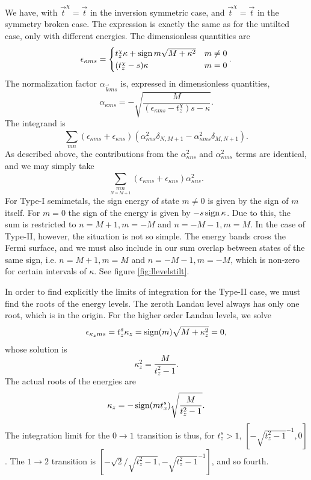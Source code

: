 We have, with \( \vec{t}^{\chi } = \vec{t} \) in the inversion symmetric case, and \( \vec{t}^{\chi } = \vec{t} \) in the symmetry broken case.
The expression is exactly the same as for the untilted case, only with different energies.
The dimensionless quantities are
\begin{equation}
  \label{eq:104}
  \epsilon_{\kappa m s} =
  \begin{cases}
    t_z^{\chi } \kappa + \operatorname{sign}{m} \sqrt{M + \kappa ^2} & m \neq 0\\
    (t_z^{\chi } - s) \kappa & m = 0
  \end{cases}.
\end{equation}
The normalization factor \( \alpha _{\vec{k} m s} \) is, expressed in dimensionless quantities,
\begin{equation}
  \label{eq:105}
  \alpha _{\kappa m s} =
  -\sqrt{\frac{M}{(\epsilon_{\kappa  m s} - t_{z}^{\chi })s - \kappa }}.
\end{equation}
The integrand is
\begin{equation}
  \label{eq:106}
  \sum\limits_{mn}^{}
  (\epsilon_{\kappa m s} + \epsilon_{\kappa n s}) (\alpha_{\kappa n s}^2 \delta _{N, M+1}- \alpha_{\kappa m s}^2 \delta_{M, N+1}).
\end{equation}
As described above, the contributions from the \( \alpha _{\kappa n s}^2  \) and \( \alpha _{\kappa m s}^2 \) terms are identical, and we may simply take
\begin{equation}
  \label{eq:107}
  \sum\limits_{\underset{N=M+1}{mn}}^{}
  (\epsilon_{\kappa m s} + \epsilon_{\kappa n s}) \alpha_{\kappa n s}^2.
\end{equation}
For Type-I semimetals, the sign energy of state \( m \neq 0 \) is given by the sign of \( m \) itself.
For \( m = 0 \) the sign of the energy is given by \( -s \operatorname{sign}{\kappa } \).
Due to this, the sum is restricted to \( n=M+1, m=-M \) and \( n=-M-1, m=M \).
In the case of Type-II, however, the situation is not so simple.
The energy bands cross the Fermi surface, and we must also include in our sum overlap between states of the same sign, i.e. \( n=M+1, m=M \) and \( n=-M-1, m=-M \), which is non-zero for certain intervals of \( \kappa  \).
See figure \ref{fig:llevelstilt}.

In order to find explicitly the limits of integration for the Type-II case, we must find the roots of the energy levels.
The zeroth Landau level always has only one root, which is in the origin.
For the higher order Landau levels, we solve
\begin{equation}
  \label{eq:93}
  \epsilon_{\kappa_z m s } = t_z^s \kappa_z = \operatorname{sign}(m) \sqrt{M + \kappa_{z} ^2} = 0,
\end{equation}
whose solution is
\[
\kappa_z^2 = \frac{M}{t_{z}^2 - 1}.
\]
The actual roots of the energies are
\begin{equation}
  \label{eq:94}
  \kappa_z = -\operatorname{sign}(m t^s_x) \sqrt{\frac{M}{t_{z}^2 - 1}}.
\end{equation}
The integration limit for the \( 0 \to 1 \) transition is thus, for \( t_z^s > 1 \), \( [-\sqrt{t_z^2 - 1 }^{-1}, 0] \).
The \( 1\to 2 \) transition is \( [-\sqrt{2} /\sqrt{t_z^2 - 1}, -\sqrt{t_z^2 - 1 }^{-1}] \), and so fourth.

